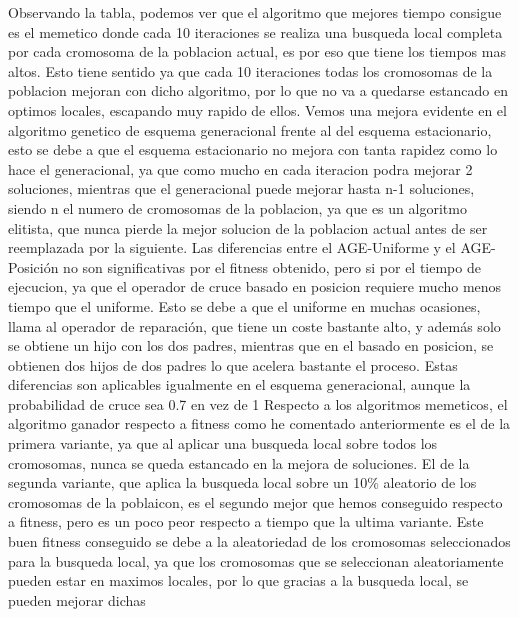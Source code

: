 \documentclass{article}
\begin{document}
Observando la tabla, podemos ver que el algoritmo que mejores tiempo consigue 
es el memetico donde cada 10 iteraciones se realiza una busqueda local completa por cada 
cromosoma de la poblacion actual, es por eso que tiene los tiempos mas altos.
Esto tiene sentido ya que cada 10 iteraciones todas los cromosomas de la poblacion 
mejoran con dicho algoritmo, por lo que no va a quedarse estancado en optimos locales, escapando 
muy rapido de ellos.
\vspace{3mm}
\newline Vemos una mejora evidente en el algoritmo genetico de esquema generacional frente al 
del esquema estacionario, esto se debe a que el esquema estacionario no mejora con tanta rapidez
como lo hace el generacional, ya que como mucho en cada iteracion podra mejorar 2 soluciones, mientras que el 
generacional puede mejorar hasta n-1 soluciones, siendo n el numero de cromosomas de la poblacion, ya que es 
un algoritmo elitista, que nunca pierde la mejor solucion de la poblacion actual antes de ser 
reemplazada por la siguiente.
\vspace{3mm}
\newline Las diferencias entre el AGE-Uniforme y el AGE-Posición no son significativas por el fitness 
obtenido, pero si por el tiempo de ejecucion, ya que el operador de cruce basado en posicion 
requiere mucho menos tiempo que el uniforme. Esto se debe a que el uniforme en muchas ocasiones,
llama al operador de reparación, que tiene un coste bastante alto, y además solo se obtiene 
un hijo con los dos padres, mientras que en el basado en posicion, se obtienen 
dos hijos de dos padres lo que acelera bastante el proceso.
Estas diferencias son aplicables igualmente en el esquema generacional, aunque la probabilidad
de cruce sea 0.7 en vez de 1
\vspace{3mm}
\newline Respecto a los algoritmos memeticos, el algoritmo ganador respecto a fitness como he 
comentado anteriormente es el de la primera variante, ya que al aplicar una busqueda local sobre todos 
los cromosomas, nunca se queda estancado en la mejora de soluciones.
El de la segunda variante, que aplica la busqueda local sobre un 10\% aleatorio de los cromosomas 
de la poblaicon, es el segundo mejor que hemos conseguido respecto a fitness, pero es un poco peor respecto 
a tiempo que la ultima variante. Este buen fitness conseguido se debe a la aleatoriedad de los cromosomas
seleccionados para la busqueda local, ya que los cromosomas que se seleccionan aleatoriamente 
pueden estar en maximos locales, por lo que gracias a la busqueda local, se pueden mejorar dichas 
\end{document}

